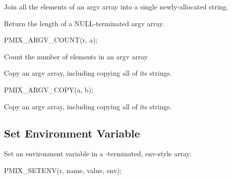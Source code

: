 Join all the elements of an argv array into a single newly-allocated string.


Return the length of a NULL-terminated argv array.

\cspecificstart
\begin{codepar}
PMIX_ARGV_COUNT(r, a);
\end{codepar}
\cspecificend

\begin{arglist}
\end{arglist}

Count the number of elements in an argv array


Copy an argv array, including copying all of its strings.

\cspecificstart
\begin{codepar}
PMIX_ARGV_COPY(a, b);
\end{codepar}
\cspecificend

\begin{arglist}
\end{arglist}

Copy an argv array, including copying all of its strings.


\subsection{Set Environment Variable}

\summary

Set an environment variable in a -terminated, env-style array.

\cspecificstart
\begin{codepar}
PMIX_SETENV(r, name, value, env);
\end{codepar}
\cspecificend


\begin{arglist}
\end{arglist}

